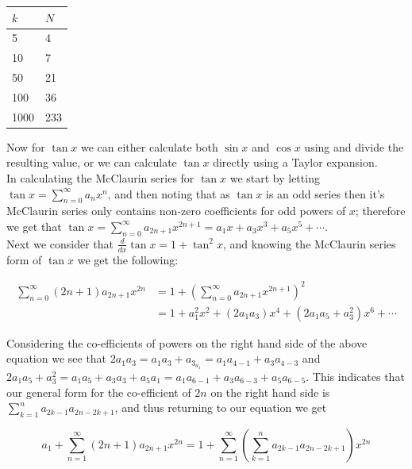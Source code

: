 {%
\begin{center}
\begin{tabular}{|p{3cm}|p{3cm}|}
	\hline
	\(k\) & \(N\)\\
	\hline
	5 & 4\\\hline
	10 & 7\\\hline
	50 & 21\\\hline
	100 & 36\\\hline
	1000 & 233\\\hline
\end{tabular}
\end{center}

Now for \(\tan x\) we can either calculate both \(\sin x\) and \(\cos x\) using  and divide the resulting value, or we can calculate \(\tan x\) directly using a Taylor expansion.\\

In calculating the McClaurin series for \(\tan x\) we start by letting \(\tan x = \sum_{n=0}^\infty a_nx^n\), and then noting that as \(\tan x\) is an odd series then it's McClaurin series only contains non-zero coefficients for odd powers of \(x\); therefore we get that \(\tan x = \sum_{n=0}^\infty a_{2n+1}x^{2n+1} = a_1x + a_3x^3 + a_5x^5 + \cdots\).\\

Next we consider that \(\frac{d}{dx} \tan x = 1 + \tan^2 x\), and knowing the McClaurin series form of \(\tan x\) we get the following:

\begin{displaymath}
\begin{align*}
	\sum_{n=0}^\infty (2n+1)a_{2n+1}x^{2n} &= 1 + 
		(\sum_{n=0}^\infty a_{2n+1}x^{2n+1})^2\\
	&= 1 + a_1^2x^2 + (2a_1a_3)x^4 + (2a_1a_5 + a_3^2)x^6 + \cdots
\end{align*}
\end{displaymath}

Considering the co-efficients of powers on the right hand side of the above equation we see that \(2a_1a_3 = a_1a_3 + a_3_a_1 = a_1a_{4-1} + a_3a_{4-3}\) and \(2a_1a_5 + a_3^2 = a_1a_5 + a_3a_3 + a_5a_1 = a_1a_{6-1} + a_3a_{6-3} +a_5a_{6-5}\). This indicates that our general form for the co-efficient of \(2n\) on the right hand side is \(\sum_{k=1}^n a_{2k-1}a_{2n - 2k + 1}\), and thus returning to our equation we get

\[a_1 + \sum_{n=1}^\infty (2n+1)a_{2n+1}x^{2n} = 1 + \sum_{n=1}^\infty(\sum_{k=1}^n a_{2k-1}a_{2n-2k+1})x^{2n}\]

}
